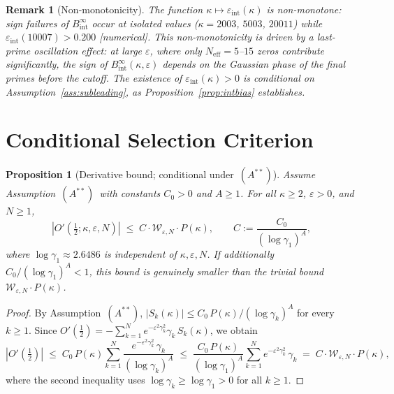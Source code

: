\documentclass[11pt]{article}
\newtheorem{proposition}[theorem]{Proposition}
\newtheorem*{remark}{Remark}
\newcommand{\Wgamma}{\mathcal{W}_{\varepsilon,N}}   %
\newcommand{\Astar}{\ensuremath{(A^{**})}}  %
\begin{document}
\begin{remark}[Non-monotonicity]
The function $\kappa\mapsto\varepsilon_{\mathrm{int}}(\kappa)$ is non-monotone:
sign failures of $B_{\mathrm{int}}^\infty$ occur at isolated values
($\kappa=2003$, $5003$, $20011$) while $\varepsilon_{\mathrm{int}}(10007)>0.200$
[numerical].
This non-monotonicity is driven by a last-prime oscillation effect:
at large $\varepsilon$, where only $N_{\mathrm{eff}}=5$--$15$ zeros
contribute significantly, the sign of $B_{\mathrm{int}}^\infty(\kappa,\varepsilon)$
depends on the Gaussian phase of the final primes before the cutoff.
The existence of $\varepsilon_{\mathrm{int}}(\kappa)>0$ is conditional on
Assumption~\ref{ass:subleading},
as Proposition~\ref{prop:intbias} establishes.
\end{remark}

\section{Conditional Selection Criterion}
\label{sec:sel}

\begin{proposition}[Derivative bound; conditional under~\Astar]
\label{prop:deriv}
Assume Assumption~\Astar\ with constants $C_0>0$ and $A\ge 1$.
For all $\kappa\ge 2$, $\varepsilon>0$, and $N\ge 1$,
\[
\left|O'\!\left(\tfrac12;\kappa,\varepsilon,N\right)\right|
\;\le\; C\cdot\Wgamma\cdot P(\kappa),
\qquad C:=\frac{C_0}{(\log\gamma_1)^A},
\]
where $\log\gamma_1\approx 2.6486$ is independent of
$\kappa,\varepsilon,N$.
If additionally $C_0/(\log\gamma_1)^A<1$, this bound is
genuinely smaller than the trivial bound $\Wgamma\cdot P(\kappa)$.
\end{proposition}

\begin{proof}
By Assumption~\Astar, $|S_k(\kappa)|\le C_0\,P(\kappa)/(\log\gamma_k)^A$
for every $k\ge 1$.
Since $O'(\tfrac12)=-\sum_{k=1}^N e^{-\varepsilon^2\gamma_k^2}\gamma_k\,S_k(\kappa)$,
we obtain
\[
|O'(\tfrac12)|
  \;\le\; C_0\,P(\kappa)\sum_{k=1}^N
         \frac{e^{-\varepsilon^2\gamma_k^2}\,\gamma_k}{(\log\gamma_k)^A}
  \;\le\; \frac{C_0\,P(\kappa)}{(\log\gamma_1)^A}
         \sum_{k=1}^N e^{-\varepsilon^2\gamma_k^2}\,\gamma_k
  \;=\; C\cdot\Wgamma\cdot P(\kappa),
\]
where the second inequality uses $\log\gamma_k\ge\log\gamma_1>0$
for all $k\ge 1$.
\end{proof}
\end{document}
